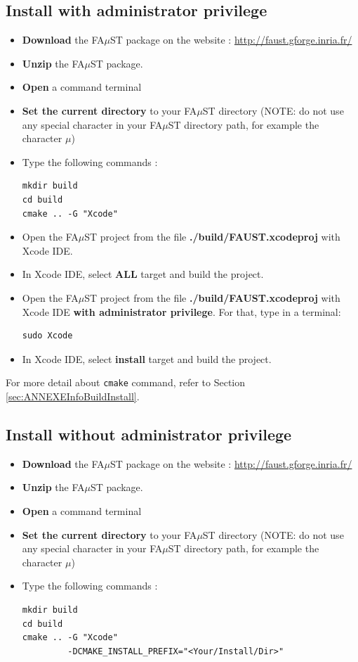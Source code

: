 \begin{itemize}
\subsection{Install with administrator privilege}\label{sec:XcodeUnixBuildInstallAdmin}
 
\begin{itemize}
\item \textbf{Download} the FA$\mu$ST package on the website :  \url{http://faust.gforge.inria.fr/}
\item \textbf{Unzip} the FA$\mu$ST package.
\item \textbf{Open} a command terminal
\item \textbf{Set the current directory} to your FA$\mu$ST directory (NOTE: do not use any special character in your FA$\mu$ST directory path, for example the character $\mu$)
\item Type the following commands : 
\begin{lstlisting}
mkdir build
cd build
cmake .. -G "Xcode"
\end{lstlisting}

\item Open the FA$\mu$ST project from the file \textbf{./build/FAUST.xcodeproj} with Xcode IDE. 
\item In Xcode IDE, select \textbf{ALL} target and build the project. 
\item Open the FA$\mu$ST project from the file \textbf{./build/FAUST.xcodeproj} with Xcode IDE \textbf{with administrator privilege}. For that, type in a terminal:
\begin{lstlisting}
sudo Xcode
\end{lstlisting}
\item In Xcode IDE, select \textbf{install} target and build the project. 
\end{itemize}

For more detail about \texttt{cmake} command, refer to Section \ref{sec:ANNEXEInfoBuildInstall}.


\subsection{Install without administrator privilege}\label{sec:XcodeUnixBuildInstallNOAdmin}
 
\begin{itemize}
\item \textbf{Download} the FA$\mu$ST package on the website :  \url{http://faust.gforge.inria.fr/}
\item \textbf{Unzip} the FA$\mu$ST package.
\item \textbf{Open} a command terminal
\item \textbf{Set the current directory} to your FA$\mu$ST directory (NOTE: do not use any special character in your FA$\mu$ST directory path, for example the character $\mu$)
\item Type the following commands : 
\begin{lstlisting}
mkdir build
cd build
cmake .. -G "Xcode" 
		 -DCMAKE_INSTALL_PREFIX="<Your/Install/Dir>"
\end{lstlisting}


\end{itemize}
\end{itemize}
